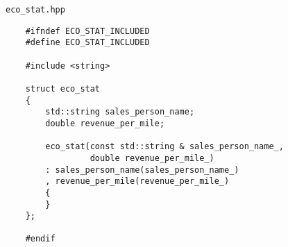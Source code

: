 \texttt{eco_stat.hpp}

\begin{verbatim}
    #ifndef ECO_STAT_INCLUDED
    #define ECO_STAT_INCLUDED
    
    #include <string>
    
    struct eco_stat
    {
        std::string sales_person_name;
        double revenue_per_mile;
    
        eco_stat(const std::string & sales_person_name_,
                 double revenue_per_mile_)
        : sales_person_name(sales_person_name_)
        , revenue_per_mile(revenue_per_mile_)
        {
        }
    };
    
    #endif
\end{verbatim}
